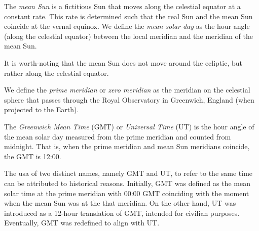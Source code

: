 \documentclass[../main.tex]{subfiles}
\begin{document}
\begin{definition}
  The \emph{mean Sun} is a fictitious Sun that moves along the celestial equator at a constant rate. This rate is determined such that the real Sun and the mean Sun coincide at the vernal equinox. We define the \emph{mean solar day} as the hour angle (along the celestial equator) between the local meridian and the meridian of the mean Sun.
\end{definition}
It is worth-noting that the mean Sun does not move around the ecliptic, but rather along the celestial equator.
\begin{definition}
  We define the \emph{prime meridian} or \emph{zero meridian} as the meridian on the celestial sphere that passes through the Royal Observatory in Greenwich, England (when projected to the Earth).
\end{definition}
\begin{definition}
  The \emph{Greenwich Mean Time} (GMT) or \emph{Universal Time} (UT) is the hour angle of the mean solar day measured from the prime meridian and counted from midnight. That is, when the prime meridian and mean Sun meridians coincide, the GMT is 12:00.

\end{definition}
The usa of two distinct names, namely GMT and UT, to refer to the same time can be attributed to historical reasons. Initially, GMT was defined as the mean solar time at the prime meridian with 00:00 GMT coinciding with the moment when the mean Sun was at the that meridian. On the other hand, UT was introduced as a 12-hour translation of GMT, intended for civilian purposes. Eventually, GMT was redefined to align with UT.
\end{document}
